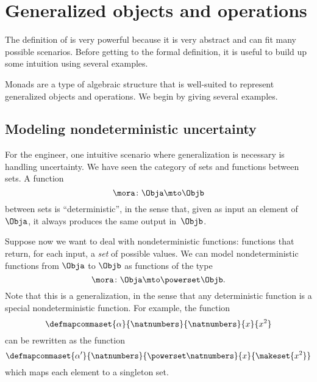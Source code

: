 
\section{Generalized objects and operations}

The definition of  is very powerful because it is very abstract and can fit many possible scenarios.
Before getting to the formal definition, it is useful to build up some intuition using several examples.

Monads are a type of algebraic structure that is well-suited to represent generalized objects and operations.
We begin by giving several examples.

\subsection{Modeling nondeterministic uncertainty}

For the engineer, one intuitive scenario where generalization is necessary is handling uncertainty.
We have seen the category  \Set of sets and functions between sets.
A function
\begin{equation}
    \label{eq:monad-simple}
    \mora\colon\Obja\mto\Objb
\end{equation}
between sets is ``deterministic'', in the sense that, given as input an element of~$\Obja$, it always produces the same output in~$\Objb$.

Suppose now we want to deal with nondeterministic functions: functions that return, for each input, a \emph{set} of possible values.
We can model nondeterministic functions from $\Obja$ to $\Objb$ as functions of the type
\begin{equation}
    \label{eq:monad-generalized}
    \mora\colon\Obja\mto\powerset\Objb.
\end{equation}
%
Note that this is a generalization, in the sense that any deterministic function is a special nondeterministic function.
For example, the function
%
\begin{equation}
    \label{eq:monad-alpha-example1}
    \defmapcommaset{
        \alpha
    }{
        \natnumbers
    }{
        \natnumbers
    }{
        x
    }{
        x^2
    }
\end{equation}
%
can be rewritten as the function
%
\begin{equation}
    \label{eq:monad-alpha-example2}
    \defmapcommaset{
        \alpha'
    }{
        \natnumbers
    }{
        \powerset\natnumbers
    }{
        x
    }{
        \makeset{x^2}
    }
\end{equation}
%
which maps each element to a singleton set.

